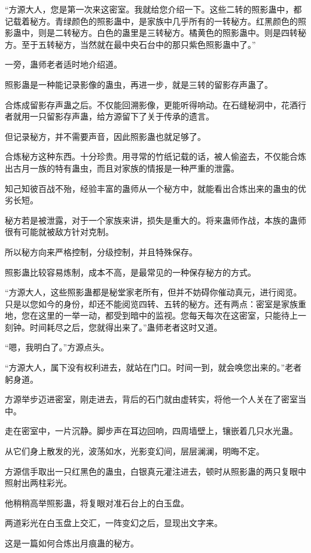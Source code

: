 \begin{this_body}
“方源大人，您是第一次来这密室。我就给您介绍一下。这些二转的照影蛊中，都记载着秘方。青绿颜色的照影蛊中，是家族中几乎所有的一转秘方。红黑颜色的照影蛊中，则是二转秘方。白色的蛊里是三转秘方。橘黄色的照影蛊中。则是四转秘方。至于五转秘方，当然就在最中央石台中的那只紫色照影蛊中了。”

一旁，蛊师老者适时地介绍道。

照影蛊是一种能记录影像的蛊虫，再进一步，就是三转的留影存声蛊了。

合炼成留影存声蛊之后。不仅能回溯影像，更能听得响动。在石缝秘洞中，花酒行者就用一只留影存声蛊，给方源留下了关于传承的遗言。

但记录秘方，并不需要声音，因此照影蛊也就足够了。

合炼秘方这种东西。十分珍贵。用寻常的竹纸记载的话，被人偷盗去，不仅能合炼出古月一族的特有蛊虫，而且对家族的情报是一种严重的泄露。

知己知彼百战不殆，经验丰富的蛊师从一个秘方中，就能看出合炼出来的蛊虫的优劣长短。

秘方若是被泄露，对于一个家族来讲，损失是重大的。将来蛊师作战，本族的蛊师很有可能就被敌方针对克制。

所以秘方向来严格控制，分级控制，并且特殊保存。

照影蛊比较容易炼制，成本不高，是最常见的一种保存秘方的方式。

“方源大人，这些照影蛊都是秘堂家老所有，但并不妨碍你催动真元，进行阅览。只是以您如今的身份，却还不能阅览四转、五转的秘方。还有两点：密室是家族重地，您在这里的一举一动，都受到暗中的监视。您每天每次在这密室，只能待上一刻钟。时间耗尽之后，您就得出来了。”蛊师老者这时又道。

“嗯，我明白了。”方源点头。

“方源大人，属下没有权利进去，就站在门口。时间一到，就会唤您出来的。”老者躬身道。

方源举步迈进密室，刚走进去，背后的石门就由虚转实，将他一个人关在了密室当中。

走在密室中，一片沉静。脚步声在耳边回响，四周墙壁上，镶嵌着几只水光蛊。

从它们身上散发的光，波荡如水，光影变幻间，层层澜澜，明晦不定。

方源信手取出一只红黑色的蛊虫，白银真元灌注进去，顿时从照影蛊的两只复眼中照射出两柱彩光。

他稍稍高举照影蛊，将复眼对准石台上的白玉盘。

两道彩光在白玉盘上交汇，一阵变幻之后，显现出文字来。

这是一篇如何合炼出月痕蛊的秘方。


\end{this_body}
